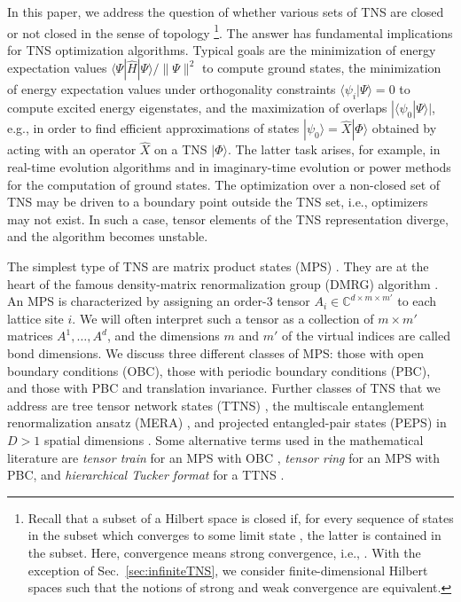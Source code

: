 \documentclass[english,11pt,aps,pra,onecolumn,tightenlines,groupedaddress,superscriptaddress,notitlepage,floatfix,fleqn]{revtex4-1}
\newcommand{\bra}{\langle}
\newcommand{\ket}{\rangle}
\newcommand{\hH}{\hat{H}}
\newcommand{\CC}{\mathbb{C}}
\begin{document}
In this paper, we address the question of whether various sets of TNS are closed or not closed in the sense of topology \footnote{Recall that a subset of a Hilbert space is closed if, for every sequence of states  in the subset which converges to some limit state \unexpanded{$\Psi^*$}, the latter is contained in the subset. Here, convergence means strong convergence, i.e., . With the exception of Sec.~\ref{sec:infiniteTNS}, we consider finite-dimensional Hilbert spaces such that the notions of strong and weak convergence are equivalent.}. The answer has fundamental implications for TNS optimization algorithms. Typical goals are the minimization of energy expectation values $\bra\Psi|\hH|\Psi\ket/\|\Psi\|^2$ to compute ground states, the minimization of energy expectation values under orthogonality constraints $\bra \psi_i|\Psi\ket=0$ to compute excited energy eigenstates, and the maximization of overlaps $|\bra\psi_0|\Psi\ket|$, e.g., in order to find efficient approximations of states $|\psi_0\ket=\hat{X}|\Phi\ket$ obtained by acting with an operator $\hat{X}$ on a TNS $|\Phi\ket$. The latter task arises, for example, in real-time evolution algorithms and in imaginary-time evolution or power methods for the computation of ground states.
The optimization over a non-closed set of TNS may be driven to a boundary point outside the TNS set, i.e., optimizers may not exist. In such a case, tensor elements of the TNS representation diverge, and the algorithm becomes unstable.

The simplest type of TNS are matrix product states (MPS) \cite{Baxter1968-9,Accardi1981,Fannes1992-144,White1992-11,Rommer1997,PerezGarcia2007-7,Schollwoeck2011-326}. They are at the heart of the famous density-matrix renormalization group (DMRG) algorithm \cite{White1992-11,Rommer1997,Schollwoeck2011-326}. An MPS is characterized by assigning an order-3 tensor $A_i\in \CC^{d\times m\times m'}$ to each lattice site $i$. We will often interpret such a tensor as a collection of $m\times m'$ matrices $A^{1},\dotsc, A^{d}$, and the dimensions $m$ and $m'$ of the virtual indices are called bond dimensions. We discuss three different classes of MPS: those with open boundary conditions (OBC), those with periodic boundary conditions (PBC), and those with PBC and translation invariance. Further classes of TNS that we address are tree tensor network states (TTNS) \cite{Shi2006-74,Murg2010-82}, the multiscale entanglement renormalization ansatz (MERA) \cite{Vidal-2005-12,Vidal2006}, and projected entangled-pair states (PEPS) in $D>1$ spatial dimensions \cite{Niggemann1997-104,Nishino2000-575,Martin-Delgado2001-64,Verstraete2004-7,Verstraete2006-96}.
Some alternative terms used in the mathematical literature are \emph{tensor train} for an MPS with OBC \cite{Oseledets2011-33}, \emph{tensor ring} for an MPS with PBC, and \emph{hierarchical Tucker format} for a TTNS \cite{Hackbusch2009-15,Grasedyck2010-31}.
\end{document}
